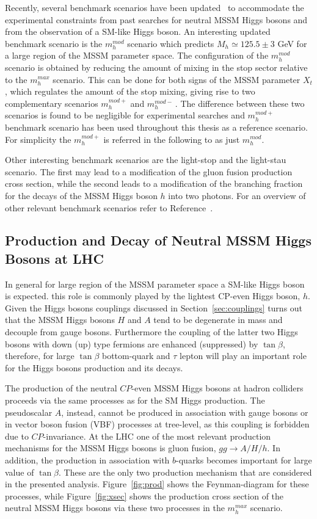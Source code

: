 Recently, several benchmark scenarios have been updated~\cite{LHCxsec} to  
accommodate the experimental constraints from past searches for neutral MSSM Higgs bosons and from the observation of a SM-like Higgs boson.
An interesting updated benchmark scenario is the $m_h^{mod}$ scenario which predicts $M_h \simeq 125.5 \pm 3 $ GeV 
for a large region of the MSSM parameter space.  The configuration of the $m_h^{mod}$ scenario is obtained by reducing the amount 
of mixing in the stop sector relative to  the  $m_h^{max}$ scenario. This can be done for both signs of the MSSM parameter $X_t$, which 
regulates the amount of the stop mixing, giving rise to two complementary scenarios $m_h^{mod+}$ and $m_h^{mod-}\,.$
The difference between these two scenarios is found to be negligible for experimental searches and
 $m_h^{mod+}$ benchmark scenario has been used throughout this thesis as a reference scenario. For simplicity the $m_h^{mod+}$ is referred 
in the following to as just $m_h^{mod}$.

Other interesting benchmark scenarios are the light-stop and the light-stau scenario.
The first may lead to a modification of the gluon fusion production cross section, while the second leads
to a modification of the branching fraction for the decays of the MSSM Higgs boson $h$ into two photons.
For an overview of other relevant  benchmark scenarios refer to Reference~\cite{LHCxsec}. 



 


\subsection{Production and Decay of Neutral MSSM Higgs Bosons at LHC}
In general for large region of the MSSM parameter space a SM-like Higgs boson is expected. 
this role is commonly played by the lightest CP-even Higgs boson, $h$. 
Given the Higgs bosons couplings discussed in Section~\ref{sec:couplings} turns out that the MSSM Higgs bosons $H$ and $A$
tend to be degenerate in mass and decouple from gauge bosons. Furthermore the coupling of the latter
two Higgs bosons with down (up) type fermions are enhanced (suppressed) by $\tan\beta$, therefore, for large $\tan\beta$
bottom-quark and $\tau$ lepton will play an important role for 
the Higgs bosons production and its decays.  

The production of the neutral $CP$-even MSSM Higgs bosons at hadron
colliders proceeds via the same processes as for the SM Higgs
production. The pseudoscalar $A$, instead, cannot be produced
in association with gauge bosons or in vector boson fusion (VBF) processes at
tree-level, as this coupling is forbidden due to $CP$-invariance.  At
the LHC one of the most relevant production mechanisms for the MSSM
Higgs bosons is gluon fusion, $gg\rightarrow A/H/h$. In
addition, the production in association with $b$-quarks becomes
important for large value of $\tan\beta$. These are the only two production mechanism
that are considered in the presented analysis. Figure~\ref{fig:prod} shows the Feynman-diagram
for these processes, while Figure~\ref{fig:xsec} shows the production cross section of the neutral 
MSSM Higgs bosons via these two processes in the $m_h^{max}$ scenario.


